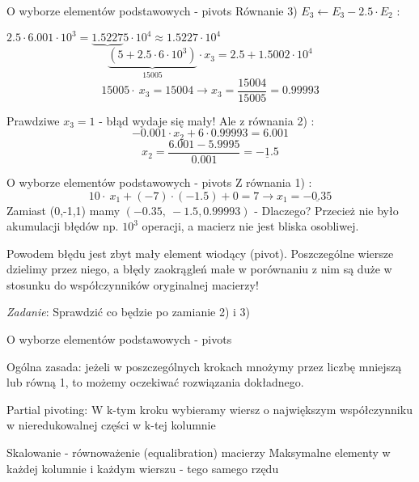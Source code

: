 \begin{frame}{ O wyborze elementów podstawowych - pivots}
Równanie 3) $E_{3}\leftarrow E_{3}-2.5\cdot E_{2}$ :
\begin{center}
$2.5 \cdot 6.001\cdot 10^{3}=\underbrace{1.5227}5\cdot 10^{4} \approx 1.5227\cdot 10^{4}$
$$
\underbrace{(5 + 2.5\cdot 6\cdot 10^{3})}_{15005}\cdot x_{3}= 2.5 + 1.5002\cdot 10^{4}
$$
$$
15005\cdot\ x_{3}=15004\rightarrow x_{3}=\frac{15004}{15005}=0.99993
$$
\end{center}
Prawdziwe $x_{3}=1$ - błąd wydaje się mały!
\newline
Ale z równania 2) :
$$
-0.001\cdot x_{2}+6\cdot 0.99993=6.001
$$
$$
x_{2}=\frac{6.001-5.9995}{0.001}=\underline{-1.5}
$$
\end{frame}
\begin{frame}{O wyborze elementów podstawowych - pivots}
Z równania 1) :
$$
10\cdot\ x_{1}+(-7)\cdot(-1.5)+0=7\rightarrow x_{1}=\underline{-0.35}
$$
Zamiast (0,-1,1) mamy $(-0.35,\ -1.5,0.99993)$ - Dlaczego? \newline 
Przecież nie było akumulacji błędów np. $10^{3}$ operacji, a macierz nie jest bliska osobliwej.
\begin{alertblock}{}
Powodem błędu jest zbyt mały element wiodący (pivot). Poszczególne wiersze dzielimy przez niego, a błędy zaokrągleń małe w porównaniu z nim są duże w stosunku do współczynników oryginalnej macierzy!
\end{alertblock}
\begin{flushright}
\textit{Zadanie}: Sprawdzić co będzie po zamianie 2) i 3) 
\end{flushright}
\end{frame}
\begin{frame}{ O wyborze elementów podstawowych - pivots}

Ogólna zasada: jeżeli w poszczególnych krokach mnożymy przez liczbę mniejszą lub równą 1, to możemy oczekiwać rozwiązania dokładnego.
\begin{exampleblock}{Partial pivoting:}
W $\mathrm{k}$-tym kroku wybieramy wiersz o największym współczynniku w nieredukowalnej części w $\mathrm{k}$-tej kolumnie

\end{exampleblock}

\begin{exampleblock}{Skalowanie - równoważenie (equalibration) macierzy}
Maksymalne elementy w każdej kolumnie i każdym wierszu - tego samego rzędu
\end{exampleblock}

\end{frame}

